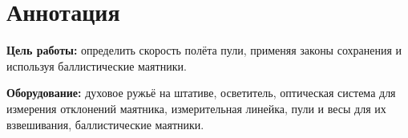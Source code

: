 \section{Аннотация}
\textbf{Цель работы:} определить скорость полёта пули, применяя законы сохранения и
используя баллистические маятники.

\textbf{Оборудование:} духовое ружьё на штативе, осветитель, оптическая система для
измерения отклонений маятника, измерительная линейка, пули и весы для их взвешивания,
баллистические маятники.
